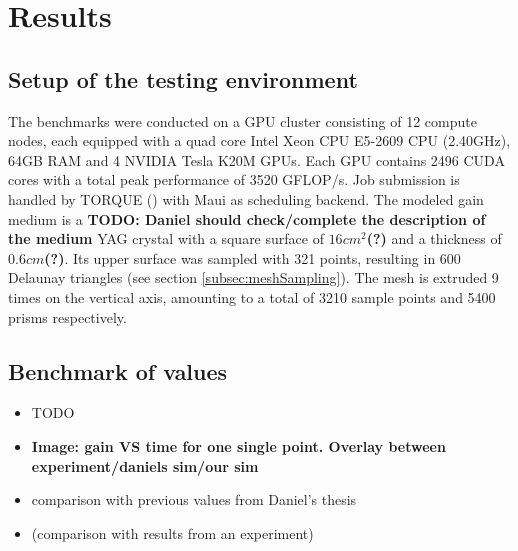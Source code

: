 \section{Results}

\subsection{Setup of the testing environment}

The benchmarks were conducted on a GPU cluster consisting of 12 compute nodes,
each equipped with a quad core Intel Xeon CPU E5-2609 CPU (2.40GHz), 64GB RAM
and 4 NVIDIA Tesla K20M GPUs. Each GPU contains 2496 CUDA cores with a total
peak performance of 3520 GFLOP/s. Job submission is handled by TORQUE
(\cite{torque}) with Maui as scheduling backend. The modeled gain medium is a
\textbf{TODO: Daniel should check/complete the description of the medium} YAG
crystal with a square surface of $16cm^2$\textbf{(?)} and a thickness of
$0.6cm$\textbf{(?)}. Its upper surface was sampled with 321 points, resulting in
600 Delaunay triangles (see section \ref{subsec:meshSampling}). The mesh is
extruded 9 times on the vertical axis, amounting to a total of 3210 sample
points and 5400 prisms respectively.



\subsection{Benchmark of values}

\begin{itemize}

  \item TODO

  \item \textbf{Image: gain VS time for one single point. Overlay between
    experiment/daniels sim/our sim}

  \item comparison with previous values from Daniel's thesis

  \item (comparison with results from an experiment)

\end{itemize}



